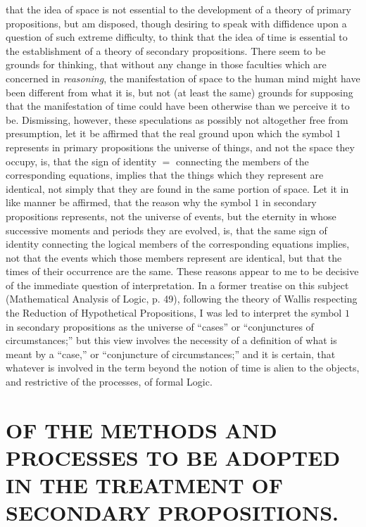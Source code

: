 \documentclass[oneside]{book}
\begin{document}
 that the idea of space is not
essential to the development of a theory of primary propositions,
but am disposed, though desiring to speak with diffidence upon
a question of such extreme difficulty, to think that the idea of
time is essential to the establishment of a theory of secondary
propositions. There seem to be grounds for thinking, that
without any change in those faculties which are concerned in
\textit{reasoning}, the manifestation of space to the human mind might
have been different from what it is, but not (at least the same)
grounds for supposing that the manifestation of time could have
been otherwise than we perceive it to be. Dismissing, however,
these speculations as possibly not altogether free from presumption,
let it be affirmed that the real ground upon which the
symbol $1$ represents in primary propositions the universe of
things, and not the space they occupy, is, that the sign of
identity $=$ connecting the members of the corresponding equations,
implies that the things which they represent are identical,
not simply that they are found in the same portion of space.
Let it in like manner be affirmed, that the reason why the symbol
$1$ in secondary propositions represents, not the universe of events,
but the eternity in whose successive moments and periods they
are evolved, is, that the same sign of identity connecting the
logical members of the corresponding equations implies, not that
the events which those members represent are identical, but that
the times of their occurrence are the same. These reasons appear
to me to be decisive of the immediate question of interpretation. In
a former treatise on this subject (Mathematical Analysis of Logic,
p. 49), following the theory of Wallis respecting the Reduction
of Hypothetical Propositions, I was led to interpret the symbol $1$
in secondary propositions as the universe of ``cases'' or ``conjunctures
of circumstances;'' but this view involves the necessity of a
definition of what is meant by a ``case,'' or ``conjuncture of
circumstances;'' and it is certain, that whatever is involved in
the term beyond the notion of time is alien to the objects, and
restrictive of the processes, of formal Logic.


\chapter[METHODS IN SECONDARY PROPOSITIONS]{\large OF THE METHODS AND PROCESSES TO BE ADOPTED IN THE TREATMENT
OF SECONDARY PROPOSITIONS.}
\end{document}
